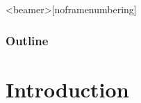 \documentclass{beamer}
\begin{document}
%


\begin{frame}<beamer>[noframenumbering]
     \frametitle{Outline}
     \tableofcontents
\end{frame}







\setcounter{tocdepth}{4}
\section{Introduction}
\end{document}
